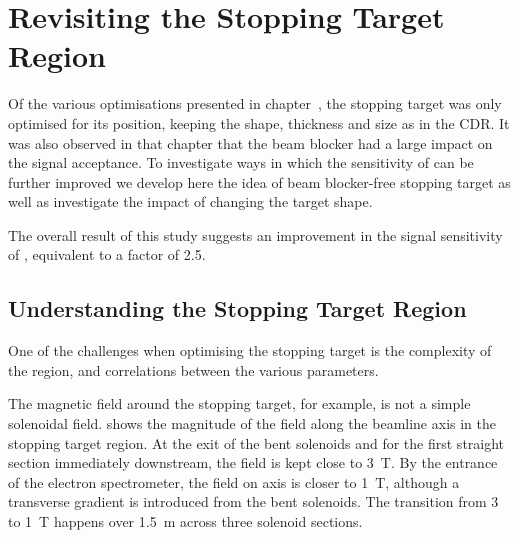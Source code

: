 
\chapter{Revisiting the Stopping Target Region}
Of the various optimisations presented in chapter~, the stopping target was only optimised for its position, keeping the shape, thickness and size as in the CDR.
It was also observed in that chapter that the beam blocker had a large impact on the signal acceptance.
To investigate ways in which the sensitivity of \phaseII can be further improved we develop here the idea of beam blocker-free stopping target as well as investigate the impact of changing the target shape.

The overall result of this study suggests an improvement in the signal sensitivity of \phaseII, equivalent to a factor of 2.5.

\section{Understanding the Stopping Target Region}
One of the challenges when optimising the stopping target is the complexity of the region, and correlations between the various parameters.

The magnetic field around the stopping target, for example, is not a simple solenoidal field.
 shows the magnitude of the field along the beamline axis in the stopping target region.
At the exit of the bent solenoids and for the first straight section immediately downstream, the field is kept close to 3~T.
By the entrance of the electron spectrometer, the field on axis is closer to 1~T, although a transverse gradient is introduced from the bent solenoids.
The transition from 3 to 1~T happens over 1.5~m across three solenoid sections.

